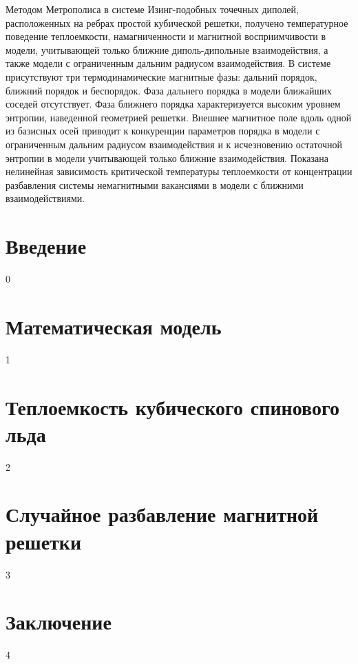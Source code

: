 \documentclass[10pt]{article}
\begin{document}
\abstract Методом Метрополиса в системе Изинг-подобных точечных диполей, расположенных на ребрах простой кубической решетки, получено температурное поведение теплоемкости, намагниченности и магнитной восприимчивости в модели, учитывающей только ближние диполь-дипольные взаимодействия, а также модели с ограниченным дальним радиусом взаимодействия. В системе присутствуют три термодинамические магнитные фазы: дальний порядок, ближний порядок и беспорядок. Фаза дальнего порядка в модели ближайших соседей отсутствует. Фаза ближнего порядка характеризуется высоким уровнем энтропии, наведенной геометрией решетки. Внешнее магнитное поле вдоль одной из базисных осей приводит к конкуренции параметров порядка в модели с ограниченным дальним радиусом взаимодействия и к исчезновению остаточной энтропии в модели учитывающей только ближние взаимодействия. Показана нелинейная зависимость критической температуры теплоемкости от концентрации разбавления системы немагнитными вакансиями в модели с ближними взаимодействиями.



\section*{Введение}

0

\section{Математическая модель} 
1

\section {Теплоемкость кубического спинового льда}

2

\section{Случайное разбавление магнитной решетки}

3


\section{Заключение}

4
\end{document}
